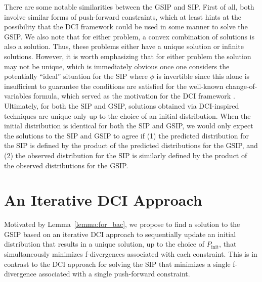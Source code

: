 \documentclass{article}
\newcommand{\tmw}[1]{{\color{red} #1}}
\newcommand{\initmeas}{P_{\text{init}}}
\begin{document}
There are some notable similarities between the GSIP and SIP.
First of all, both involve similar forms of push-forward constraints, which at least hints at the possibility that the DCI framework could be used in some manner to solve the GSIP. 
We also note that for either problem, a convex combination of solutions is also a solution.
Thus, these problems either have a unique solution or infinite solutions. 
However, it is worth emphasizing that for either problem the solution may not be unique, which is immediately obvious once one considers the potentially ``ideal'' situation for the SIP where $\phi$ is invertible since this alone is insufficient to guarantee the conditions are satisfied for the well-known change-of-variables formula, which served as the motivation for the DCI framework \cite{BET+14, BJW18a}. 
Ultimately, for both the SIP and GSIP, solutions obtained via DCI-inspired techniques are unique only up to the choice of an initial distribution. 
When the initial distribution is identical for both the SIP and GSIP, we would only expect the solutions to the SIP and GSIP to agree if (1) the predicted distribution for the SIP is defined by the product of the predicted distributions for the GSIP, and (2) the observed distribution for the SIP is similarly defined by the product of the observed distributions for the GSIP. 







\section{An Iterative DCI Approach}\label{sec:iterative_DCI}
Motivated by Lemma~\ref{lemma:for_bac}, we propose to find a solution to the GSIP based on an iterative DCI approach to sequentially update an initial distribution that results in a unique solution, up to the choice of $\initmeas$, that simultaneously minimizes f-divergences associated with each constraint.
This is in contrast to the DCI approach for solving the SIP that minimizes a single f-divergence associated with a single push-forward constraint.
\end{document}
